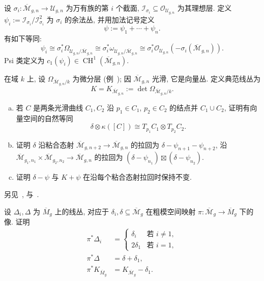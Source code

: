 \begin{definition}[Psi 线丛]\label{src:6.10.6}
设 $\sigma_i:\overline{\mathcal M}_{g,\allowbreak n}\to\mathcal U_{g,\allowbreak n}$ 为万有族的第 $i$ 个截面, $\mathcal I_{\sigma_i}\subseteq\mathcal O_{\mathcal U_{g,\allowbreak n}}$ 为其理想层. 定义  $\psi_i:=\mathcal I_{\sigma_i}/\mathcal I_{\sigma_i}^2$ 为 $\sigma_i$ 的余法丛, 并用加法记号定义
\[
\psi:=\psi_1+\cdots+\psi_n.
\]
有如下等同:
\[
\psi_i\cong\sigma_i^*\Omega_{\mathcal U_{g,n}/\overline{\mathcal M}_{g,n}}\cong\sigma_i^*\omega_{\mathcal U_{g,n}/\overline{\mathcal M}_{g,n}}\cong\sigma_i^*\mathcal O_{\mathcal U_{g,n}}(-\sigma_i(\overline{\mathcal M}_{g,n})).
\]
Psi 类定义为 $c_1(\psi_i)\in\operatorname{CH}^1(\overline{\mathcal M}_{g,\allowbreak n})$.
\end{definition}
\begin{definition}[典范线丛]\label{src:6.10.7}
在域 $k$ 上, 设 $\Omega_{\overline{\mathcal M}_{g,\allowbreak n}/k}$ 为微分层 (例~); 因 $\overline{\mathcal M}_{g,\allowbreak n}$ 光滑, 它是向量丛. 定义典范线丛为
\[
K=K_{\overline{\mathcal M}_{g,n}}:=\det\Omega_{\overline{\mathcal M}_{g,n}/k}.
\]
\end{definition}
\begin{exercise}\label{src:6.10.8}
\begin{enumerate}[(a)]
\item 若 $C$ 是两条光滑曲线 $C_1,\allowbreak C_2$ 沿 $p_1\in C_1$, $p_2\in C_2$ 的结点并 $C_1\cup C_2$, 证明有向量空间的自然等同
\[
\delta\otimes\kappa([C])\cong T_{p_1}C_1\otimes T_{p_2}C_2.
\]
\item 证明 $\delta$ 沿粘合态射 $\overline{\mathcal M}_{g,\allowbreak n+2}\to\overline{\mathcal M}_{g,\allowbreak n}$ 的拉回为 $\delta-\psi_{n+1}-\psi_{n+2}$, 沿 $\overline{\mathcal M}_{g_1,\allowbreak n_1}\times\overline{\mathcal M}_{g_2,\allowbreak n_2}\to\overline{\mathcal M}_{g,\allowbreak n}$ 的拉回为 $(\delta-\psi_{n_1})\boxtimes(\delta-\psi_{n_2})$.
\item 证明 $\delta-\psi$ 与 $K+\psi$ 在沿每个粘合态射拉回时保持不变.
\end{enumerate}
另见~\cite[第 4 节]{Knu83b}, \cite[命题 3.32]{HM98} 与~\cite[第 XVII.4 节]{ACG11}.
\end{exercise}
\begin{exercise}[与粗模空间比较]\label{src:6.10.9}
设 $\Delta_i,\allowbreak \Delta$ 为 $\overline M_g$ 上的线丛, 对应于 $\delta_i,\allowbreak \delta\subseteq\overline{\mathcal M}_g$ 在粗模空间映射 $\pi:\overline{\mathcal M}_g\to\overline M_g$ 下的像. 证明
\[
\begin{aligned}
\pi^*\Delta_i&=\begin{cases}\delta_i&\text{若 }i\ne1,\\2\delta_1&\text{若 }i=1,\end{cases}\\
\pi^*\Delta&=\delta+\delta_1,\\
\pi^*K_{\overline M_g}&=K_{\overline{\mathcal M}_g}-\delta_1.
\end{aligned}
\]
\end{exercise}
